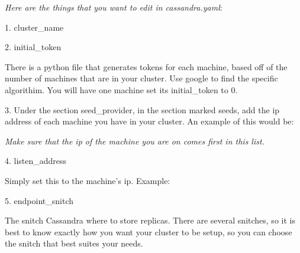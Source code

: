 \documentclass[letterpaper,12pt,english]{sphinxmanual}
\begin{document}

\begin{DUlineblock}{0em}
\item[] 
\item[] \emph{Here are the things that you want to edit in cassandra.yaml}:
\end{DUlineblock}

\begin{DUlineblock}{0em}
\item[] 1. cluster\_name
\end{DUlineblock}

\begin{DUlineblock}{0em}
\item[] 2. initial\_token
\item[] There is a python file that generates tokens for each machine, based off of the number of machines that are in your cluster. Use google to find the specific algorithim. You will have one machine set its initial\_token to 0.
\end{DUlineblock}

\begin{DUlineblock}{0em}
\item[] 3. Under the section seed\_provider, in the section marked seeds, add the ip address of each machine you have in your cluster. An example of this would be:
\end{DUlineblock}


\begin{DUlineblock}{0em}
\item[] \emph{Make sure that the ip of the machine you are on comes first in this list.}
\end{DUlineblock}

\begin{DUlineblock}{0em}
\item[] 4. listen\_address
\item[] Simply set this to the machine's ip. Example:
\item[] 
\end{DUlineblock}

\begin{DUlineblock}{0em}
\item[] 5. endpoint\_snitch
\item[] The snitch Cassandra where to store replicas. There are several snitches, so it is best to know exactly how you want your cluster to be setup, so you can choose the snitch that best suites your needs.
\end{DUlineblock}
\end{document}
